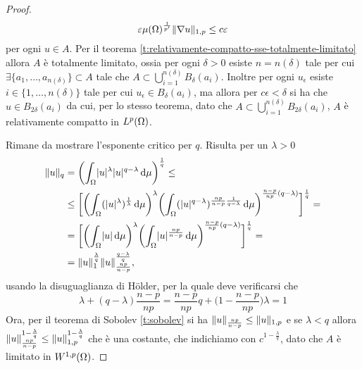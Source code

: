 \begin{proof}
\begin{equation}
        \epsilon\mu(\Omega)^\frac1{p'}\norm{\grad u}_{1,p}\le
        c\epsilon
    \end{equation}
    per ogni $u\in A$.
    Per il teorema \ref{t:relativamente-compatto-sse-totalmente-limitato} allora $A$ è totalmente limitato, ossia per ogni $\delta>0$ esiste $n=n(\delta)$ tale per cui $\exists\{a_1,\dotsc,a_{n(\delta)}\}\subset A$ tale che $A\subset\bigcup_{i=1}^{n(\delta)}B_\delta(a_i)$.
    Inoltre per ogni $u_\epsilon$ esiste $i\in\{1,\dotsc,n(\delta)\}$ tale per cui $u_\epsilon\in B_\delta(a_i)$, ma allora per $c\epsilon<\delta$ si ha che $u\in B_{2\delta}(a_i)$ da cui, per lo stesso teorema, dato che $A\subset\bigcup_{i=1}^{n(\delta)}B_{2\delta}(a_i)$, $A$ è relativamente compatto in $\leb[p]{\Omega}$.

    Rimane da mostrare l'esponente critico per $q$.
    Risulta per un $\lambda>0$
    \begin{equation}
        \begin{split}
            \norm{u}_q&=
            \biggl(\int_\Omega\abs{u}^\lambda\abs{u}^{q-\lambda}\,\dd\mu\biggr)^\frac1{q}\le\\ &\le
            \biggl[
                \biggl(\int_\Omega(\abs{u}^\lambda)^\frac1{\lambda}\,\dd\mu\biggr)^\lambda
                \biggl(\int_\Omega(\abs{u}^{q-\lambda})^{\frac{np}{n-p}\frac1{q-\lambda}}\,\dd\mu\biggr)^{\frac{n-p}{np}(q-\lambda)}
            \biggr]^\frac1{q}=\\ &=
            \biggl[
                \biggl(\int_\Omega\abs{u}\,\dd\mu\biggr)^\lambda
                \biggl(\int_\Omega\abs{u}^\frac{np}{n-p}\,\dd\mu\biggr)^{\frac{n-p}{np}(q-\lambda)}
            \biggr]^\frac1{q}=\\ &=
            \norm{u}_1^\frac{\lambda}{q}\norm{u}_\frac{np}{n-p}^\frac{q-\lambda}{q},
        \end{split}
    \end{equation}
    usando la disuguaglianza di Hölder, per la quale deve verificarsi che
    \begin{equation}
        \lambda+(q-\lambda)\frac{n-p}{np}=
        \frac{n-p}{np}q+\biggl(1-\frac{n-p}{np}\biggr)\lambda=1
        \label{eq:dim-rellich-kondrachov-lambda}
    \end{equation}
    Ora, per il teorema di Sobolev \ref{t:sobolev} si ha $\norm{u}_\frac{np}{n-p}\le\norm{u}_{1,p}$ e se $\lambda<q$ allora $\norm{u}_\frac{np}{n-p}^{1-\frac{\lambda}{q}}\le\norm{u}_{1,p}^{1-\frac{\lambda}{q}}$ che è una costante, che indichiamo con $c^{1-\frac{\lambda}{q}}$, dato che $A$ è limitato in $\sobW[1,p]{\Omega}$.

\end{proof}
